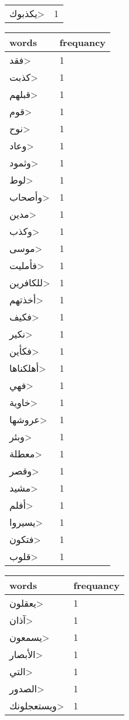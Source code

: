 \documentclass{article}
\begin{document}
\begin{multicols}{3}
\begin{center}
\begin{tabular}{ P{2cm}  P{1cm}}
\<يكذبوك> & 1 \\ 
\end{tabular} 
\begin{tabular}{ P{2cm}  P{1cm}} 
\textbf{words}    & \textbf{frequancy}  \\
\hline
\<فقد> & 1 \\ 
\<كذبت> & 1 \\ 
\<قبلهم> & 1 \\ 
\<قوم> & 1 \\ 
\<نوح> & 1 \\ 
\<وعاد> & 1 \\ 
\<وثمود> & 1 \\ 
\<لوط> & 1 \\ 
\<وأصحاب> & 1 \\ 
\<مدين> & 1 \\ 
\<وكذب> & 1 \\ 
\<موسى> & 1 \\ 
\<فأمليت> & 1 \\ 
\<للكافرين> & 1 \\ 
\<أخذتهم> & 1 \\ 
\<فكيف> & 1 \\ 
\<نكير> & 1 \\ 
\<فكأين> & 1 \\ 
\<أهلكناها> & 1 \\ 
\<فهي> & 1 \\ 
\<خاوية> & 1 \\ 
\<عروشها> & 1 \\ 
\<وبئر> & 1 \\ 
\<معطلة> & 1 \\ 
\<وقصر> & 1 \\ 
\<مشيد> & 1 \\ 
\<أفلم> & 1 \\ 
\<يسيروا> & 1 \\ 
\<فتكون> & 1 \\ 
\<قلوب> & 1 \\ 
\end{tabular} 
\begin{tabular}{ P{2cm}  P{1cm}} 
\textbf{words}    & \textbf{frequancy}  \\
\hline
\<يعقلون> & 1 \\ 
\<آذان> & 1 \\ 
\<يسمعون> & 1 \\ 
\<الأبصار> & 1 \\ 
\<التي> & 1 \\ 
\<الصدور> & 1 \\ 
\<ويستعجلونك> & 1 \\ 

\end{tabular}
\end{center}
\end{multicols}
\end{document}
